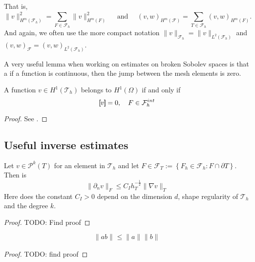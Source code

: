 That is,
\[
 \| v \|_{H^{m}( \mathcal{F}_{h} ) }^{2} = \sum_{F \in  \mathcal{F}_{h} }^{} \| v  \|_{ H^{m}( F ) }^{2  } \quad \text{ and } \quad
 (v ,w )_{H^{m}( \mathcal{F} ) }^{} = \sum_{T \in \mathcal{F} _{h}}^{} (v ,w )_{ H^{m}( F ) }^{  } .
\]
And again, we often use the more compact notation $\| v \|_{\mathcal{F}_{h}} =  \| v \|_{L^{2}( \mathcal{F}_{h} ) }$ and  $(v ,w )_{ \mathcal{F} }^{} = (v ,w )_{L^2( \mathcal{F}_{h} ) }^{} $.


A very useful lemma when working on estimates on broken Sobolev spaces is that a if a function is continuous, then the jump between the mesh elements is zero.
\begin{lemma}
    A function $ v \in  H^{1}( \mathcal{T}_{h} ) $ belongs to $ H^{1}( \Omega )  $ if and only if \[
    \left[\!\!\left[  v  \right]\!\!\right]   = 0, \quad F \in \mathcal{F}^{int}_{h}
    \]
\end{lemma}
\begin{proof}
    See \cite[Lemma 1.23]{pietro2012}.
\end{proof}



\subsection{Useful inverse estimates}%
\label{sub:useful_inverse_estimates}


\begin{lemma}
    \label{lemma:local_inverse_estimates}
    Let $v \in \mathcal{P}^{k} ( T)  $ for an element in $\mathcal{T}_{h} $ and let $F \in \mathcal{F}_{T} := \left\{ F_{h} \in \mathcal{F} _{h} : F \cap \partial T \right\}  $. Then is \[
    \| \partial _{n} v \|_{ F   }^{  } \le  C_{I} h_{T}^{-\frac{1}{2}} \| \nabla v \|_{  T}^{  }
    \]
    Here does the constant $C_{I}>0$ depend on the dimension $d$, shape regularity of $\mathcal{T}_{h} $ and the degree $k$.
\end{lemma}

\begin{proof}
    TODO: Find proof
\end{proof}

\begin{lemma}
    \label{lemma:cauchy-schwarz}
    \[
     \| ab \|_{  }^{  }  \le \| a \|_{  }^{  } \| b \|_{  }^{  }
    \]
\end{lemma}
\begin{proof}
    TODO: find proof
\end{proof}

